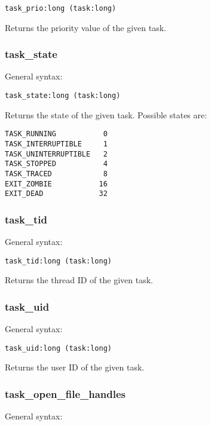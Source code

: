 \documentclass[twoside,english]{article}
\newenvironment{vindent}
{\begin{list}{}{\setlength{\listparindent}{6pt}}
\item[]}
{\end{list}}
\begin{document}
\begin{vindent}
\begin{verbatim}
task_prio:long (task:long)
\end{verbatim}
\end{vindent}
Returns the priority value of the given task.


\subsubsection{task\_state}
General syntax:

\begin{vindent}
\begin{verbatim}
task_state:long (task:long)
\end{verbatim}
\end{vindent}
Returns the state of the given task. Possible states are:

\begin{vindent}
\begin{verbatim}
TASK_RUNNING           0
TASK_INTERRUPTIBLE     1
TASK_UNINTERRUPTIBLE   2
TASK_STOPPED           4
TASK_TRACED            8
EXIT_ZOMBIE           16
EXIT_DEAD             32
\end{verbatim}
\end{vindent}

\subsubsection{task\_tid}
General syntax:

\begin{vindent}
\begin{verbatim}
task_tid:long (task:long)
\end{verbatim}
\end{vindent}
Returns the thread ID of the given task.


\subsubsection{task\_uid}
General syntax:

\begin{vindent}
\begin{verbatim}
task_uid:long (task:long)
\end{verbatim}
\end{vindent}
Returns the user ID of the given task.


\subsubsection{task\_open\_file\_handles}
General syntax:
\end{document}
